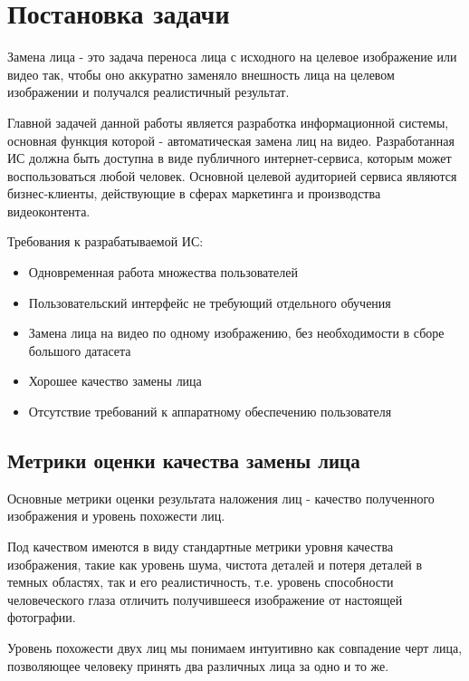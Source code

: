 \section{Постановка задачи}

Замена лица - это задача переноса лица с исходного на целевое изображение или видео так, чтобы оно аккуратно заменяло внешность лица на целевом изображении и получался реалистичный результат\cite[стр. 1]{nirkin2019fsgan}.

Главной задачей данной работы является разработка информационной системы, основная функция которой - автоматическая замена лиц на видео. Разработанная ИС должна быть доступна в виде публичного интернет-сервиса, которым может воспользоваться любой человек.
Основной целевой аудиторией сервиса являются бизнес-клиенты, действующие в сферах маркетинга и производства видеоконтента.

Требования к разрабатываемой ИС:

\begin{itemize}
    \item Одновременная работа множества пользователей
    \item Пользовательский интерфейс не требующий отдельного обучения
    \item Замена лица на видео по одному изображению, без необходимости в сборе большого датасета
    \item Хорошее качество замены лица
    \item Отсутствие требований к аппаратному обеспечению пользователя
\end{itemize}


\subsection{Метрики оценки качества замены лица}

Основные метрики оценки результата наложения лиц - качество полученного изображения и уровень похожести лиц.

Под качеством имеются в виду стандартные метрики уровня качества изображения, такие как уровень шума, чистота деталей и потеря деталей в темных областях\cite{burningham2002image}, так и его реалистичность, т.е. уровень способности человеческого глаза отличить получившееся изображение от настоящей фотографии\cite{xue2012understanding}.

Уровень похожести двух лиц мы понимаем интуитивно как совпадение черт лица, позволяющее человеку принять два различных лица за одно и то же\cite{cao2013similarity}\cite{chopra2005learning}\cite{sadovnik2018finding}.